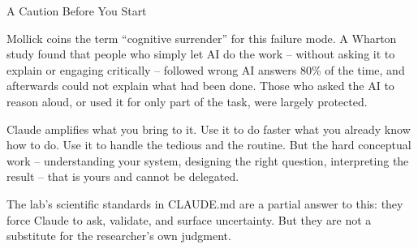 \documentclass[aspectratio=169, 10pt]{beamer}
\begin{document}
\begin{frame}{A Caution Before You Start}
{  Mollick coins the term ``cognitive surrender'' for this failure mode. A Wharton study found that people who simply let AI do the work -- without asking it to explain or engaging critically -- followed wrong AI answers 80\% of the time, and afterwards could not explain what had been done. Those who asked the AI to reason aloud, or used it for only part of the task, were largely protected.\par
  Claude amplifies what you bring to it. Use it to do faster what you already know how to do. Use it to handle the tedious and the routine. But the hard conceptual work -- understanding your system, designing the right question, interpreting the result -- that is yours and cannot be delegated.\par
  The lab's scientific standards in CLAUDE.md are a partial answer to this: they force Claude to ask, validate, and surface uncertainty. But they are not a substitute for the researcher's own judgment.}
\end{frame}
\end{document}
